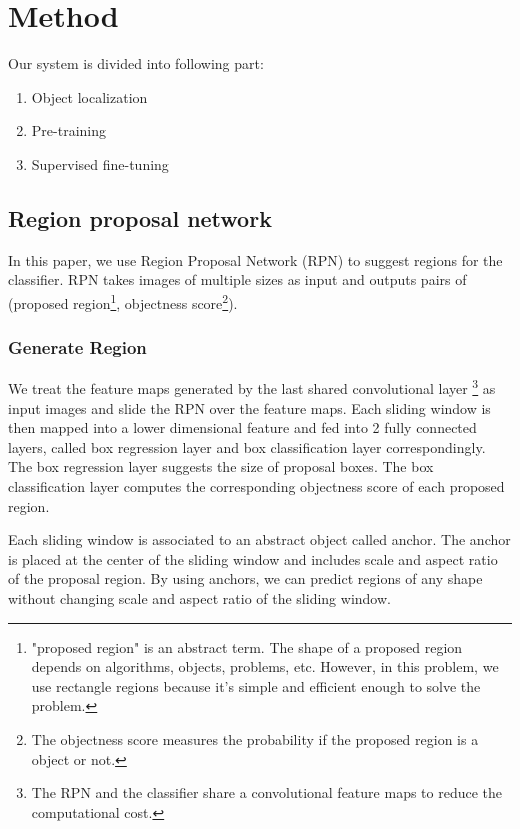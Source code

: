 \documentclass[conference]{IEEEtran}
\begin{document}
\section{Method}
Our system is divided into following part:
\begin{enumerate}
	\item Object localization
	\item Pre-training
	\item Supervised fine-tuning
\end{enumerate}	

\subsection{Region proposal network}
In this paper, we use Region Proposal Network (RPN)\cite{slidingwin5} to suggest regions for the classifier. RPN takes images of multiple sizes as input and outputs pairs of 
(proposed   region\footnote{"proposed region" is an abstract term. The shape of a proposed region depends on algorithms, objects, problems, etc. However, in this problem, we use rectangle regions because it's simple and efficient enough to solve the problem.}, objectness score\footnote{The objectness score measures the probability if the proposed region is a object or not.}).
\subsubsection{Generate Region}
We treat the feature maps generated by the last shared convolutional layer \footnote{The RPN and the classifier share a convolutional feature maps to reduce the computational cost.} as input images and slide the RPN over the feature maps. Each sliding window is then mapped into a lower dimensional feature and fed into 2 fully connected layers, called box regression layer and box classification layer correspondingly. The box regression layer suggests the size of proposal boxes. The box classification layer computes the corresponding objectness score of each proposed region.

Each sliding window is associated to an abstract object called anchor. The anchor is placed at the center of the sliding window and includes scale and aspect ratio of the proposal region. By using anchors, we can predict regions of any shape without changing scale and aspect ratio of the sliding window. 
\end{document}
